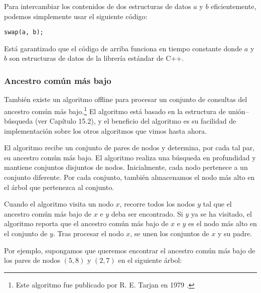 Para intercambiar los contenidos de dos estructuras de datos $a$ y $b$
eficientemente, podemos simplemente usar el siguiente código:

\begin{lstlisting}
swap(a, b);
\end{lstlisting}

Está garantizado que el código de arriba funciona en tiempo constante
donde $a$ y $b$ son estructuras de datos de la librería estándar de C++.

\subsubsection{Ancestro común más bajo}

También existe un algoritmo offline para procesar un conjunto de
consultas del ancestro común más bajo.\footnote{Este algoritmo
    fue publicado por R. E. Tarjan en 1979 \cite{tar79}.} El algoritmo
está basado en la estructura de unión--búsqueda (ver Capítulo 15.2),
y el beneficio del algoritmo es su facilidad de implementación sobre
los otros algoritmos que vimos hasta ahora.

El algoritmo recibe un conjunto de pares de nodos y determina,
por cada tal par, su ancestro común más bajo. El algoritmo realiza una
búsqueda en profundidad y mantiene conjuntos disjuntos de nodos.
Inicialmente, cada nodo pertenece a un conjunto diferente. Por cada
conjunto, también almacenamos el nodo más alto en el árbol que
pertenezca al conjunto.

Cuando el algoritmo visita un nodo $x$, recorre todos los nodos $y$
tal que el ancestro común más bajo de $x$ e $y$ deba ser encontrado.
Si $y$ ya se ha visitado, el algoritmo reporta que el ancestro común
más bajo de $x$ e $y$ es el nodo más alto en el conjunto de $y$.
Tras procesar el nodo $x$, se unen los conjuntos de $x$ y su padre.

Por ejemplo, supongamos que queremos encontrar el ancestro común
más bajo de los pares de nodos $(5,8)$ y $(2,7)$ en el siguiente árbol:
\begin{center}
\end{center}

